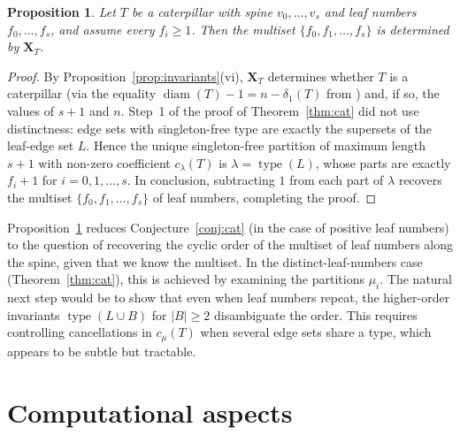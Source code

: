 \documentclass[11pt]{article}
\newtheorem{proposition}[theorem]{Proposition}
\theoremstyle{definition}
\newcommand{\X}{\mathbf{X}}
\newcommand{\type}{\operatorname{type}}
\newcommand{\diam}{\operatorname{diam}}
\begin{document}
\begin{proposition}\label{prop:partial}
Let $T$ be a caterpillar with spine $v_0,\ldots,v_s$ and leaf numbers
$f_0,\ldots,f_s$, and assume every $f_i\geq 1$.  Then the multiset
$\{f_0,f_1,\ldots,f_s\}$ is determined by $\X_T$.
\end{proposition}

\begin{proof}
By Proposition~\ref{prop:invariants}(vi), $\X_T$ determines whether $T$
is a caterpillar (via the equality $\diam(T)-1=n-\delta_1(T)$ from
\cite[Prop.~10]{MMW}) and, if so, the values of $s+1$ and $n$.
Step~1 of the proof of Theorem~\ref{thm:cat} did not use distinctness:
edge sets with singleton-free type are exactly the supersets of the
leaf-edge set $L$.  Hence the unique singleton-free partition of
maximum length $s+1$ with non-zero coefficient $c_\lambda(T)$ is
$\lambda = \type(L)$, whose parts are exactly $f_i+1$ for
$i=0,1,\ldots,s$.  In conclusion, subtracting $1$ from each part of
$\lambda$ recovers the multiset $\{f_0,f_1,\ldots,f_s\}$ of leaf
numbers, completing the proof.
\end{proof}

Proposition~\ref{prop:partial} reduces
Conjecture~\ref{conj:cat} (in the case of positive leaf numbers) to
the question of recovering the cyclic order of the multiset of leaf
numbers along the spine, given that we know the multiset.  In the
distinct-leaf-numbers case (Theorem~\ref{thm:cat}), this is achieved
by examining the partitions $\mu_i$.  The natural next step would be to
show that even when leaf numbers repeat, the higher-order invariants
$\type(L\cup B)$ for $|B|\geq 2$ disambiguate the order.  This requires
controlling cancellations in $c_\mu(T)$ when several edge sets share a
type, which appears to be subtle but tractable.

\section{Computational aspects}\label{sec:code}
\end{document}
